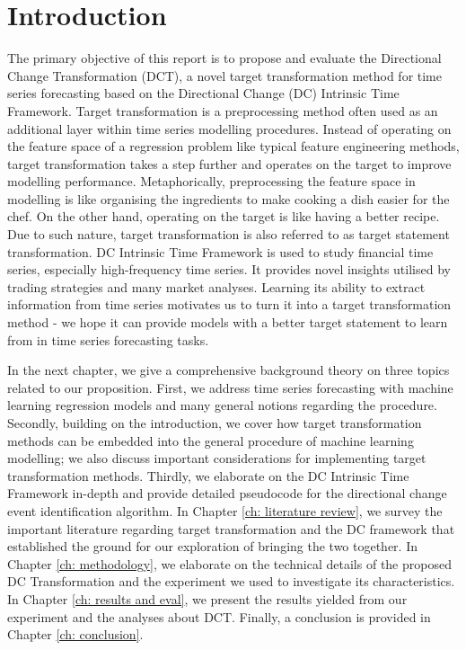 \chapter{Introduction}
The primary objective of this report is to propose and evaluate the Directional Change Transformation (DCT), a novel target transformation method for time series forecasting based on the Directional Change (DC) Intrinsic Time Framework. Target transformation is a preprocessing method often used as an additional layer within time series modelling procedures. Instead of operating on the feature space of a regression problem like typical feature engineering methods, target transformation takes a step further and operates on the target to improve modelling performance. Metaphorically, preprocessing the feature space in modelling is like organising the ingredients to make cooking a dish easier for the chef. On the other hand, operating on the target is like having a better recipe. Due to such nature, target transformation is also referred to as target statement transformation. DC Intrinsic Time Framework is used to study financial time series, especially high-frequency time series. It provides novel insights utilised by trading strategies and many market analyses. Learning its ability to extract information from time series motivates us to turn it into a target transformation method - we hope it can provide models with a better target statement to learn from in time series forecasting tasks.

In the next chapter, we give a comprehensive background theory on three topics related to our proposition. First, we address time series forecasting with machine learning regression models and many general notions regarding the procedure. Secondly, building on the introduction, we cover how target transformation methods can be embedded into the general procedure of machine learning modelling; we also discuss important considerations for implementing target transformation methods. Thirdly, we elaborate on the DC Intrinsic Time Framework in-depth and provide detailed pseudocode for the directional change event identification algorithm. In Chapter \ref{ch: literature review}, we survey the important literature regarding target transformation and the DC framework that established the ground for our exploration of bringing the two together. In Chapter \ref{ch: methodology}, we elaborate on the technical details of the proposed DC Transformation and the experiment we used to investigate its characteristics. In Chapter \ref{ch: results and eval}, we present the results yielded from our experiment and the analyses about DCT. Finally, a conclusion is provided in Chapter \ref{ch: conclusion}.
